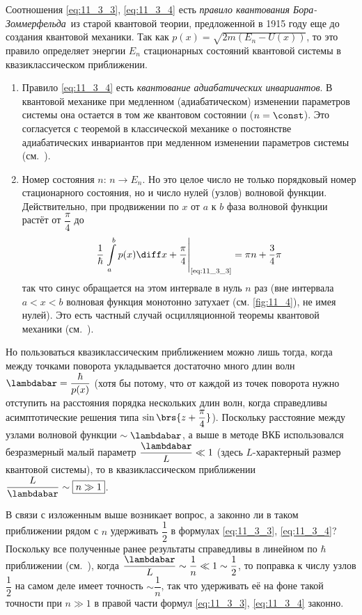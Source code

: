 Соотношения \eqref{eq:11_3_3}, \eqref{eq:11_3_4} есть {\em правило квантования Бора-Зоммерфельда}\footnotemark\ из старой квантовой теории, предложенной в 1915 году еще до создания квантовой механики. Так как $p(x) = \sqrt{2m(E_n - U(x))}$, то это правило определяет энергии $E_n$ стационарных состояний квантовой системы в квазиклассическом приближении.

\begin{enumerate}
\item Правило \eqref{eq:11_3_4} есть {\em квантование адиабатических инвариантов}. В квантовой механике при медленном (адиабатическом) изменении параметров системы она остается в том же квантовом состоянии (${n = \const}$). Это согласуется с теоремой в классической механике о постоянстве адиабатических инвариантов при медленном изменении параметров системы (см.~).

\item Номер состояния $n$: $n \to E_n$. Но это целое число не только порядковый номер стационарного состояния, но и число нулей (узлов) волновой функции. Действительно, при продвижении по $x$ от $a$ к $b$ фаза волновой функции растёт от $\dfrac{\pi}{4}$ до
$$
\frac{1}{\hbar} \left. \int \limits_{a}^{b} p(x) \diff x + \frac{\pi}{4} \right|_{\text{\eqref{eq:11_3_3}}} =\pi n + \frac{3}{4}\pi
$$%
%
так что синус обращается на этом интервале в нуль $n$ раз (вне интервала $a < x < b$ волновая функция монотонно затухает (см. \autoref{fig:11_4}), не имея нулей). Это есть частный случай осцилляционной теоремы квантовой механики (см.~).
\end{enumerate}

Но пользоваться квазиклассическим приближением можно лишь тогда, когда между точками поворота укладывается достаточно много длин волн $\lambdabar = \dfrac{\hbar}{p(x)}$ (хотя бы потому, что от каждой из точек поворота нужно отступить на расстояния порядка нескольких длин волн, когда справедливы асимптотические решения типа $\sin \brs{z + \dfrac{\pi}{4}}$). Поскольку расстояние между узлами волновой функции $\sim \lambdabar$, а выше в методе ВКБ использовался безразмерный малый параметр $\dfrac{\lambdabar}{L} \ll 1$ (здесь $L$-характерный размер квантовой системы), то в квазиклассическом приближении $\dfrac{L}{\lambdabar} \sim \boxed{n \gg 1}$.

В связи с изложенным выше возникает вопрос, а законно ли в таком приближении рядом с $n$ удерживать $\dfrac{1}{2}$ в формулах \eqref{eq:11_3_3}, \eqref{eq:11_3_4}? Поскольку все полученные ранее результаты справедливы в линейном по $\hbar$ приближении (см.~), когда $\dfrac{\lambdabar}{L} \sim \dfrac{1}{n} \ll 1 \sim \dfrac{1}{2}$, то поправка к числу узлов $\dfrac{1}{2}$ на самом деле имеет точность $\sim \dfrac{1}{n}$, так что удерживать её на фоне такой точности при $n \gg 1$ в правой части формул \eqref{eq:11_3_3}, \eqref{eq:11_3_4} законно.

